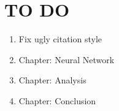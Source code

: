 \chapter{TO DO}
\begin{enumerate}
    \item Fix ugly citation style
    \item Chapter: Neural Network 
    \item Chapter: Analysis
    \item Chapter: Conclusion
\end{enumerate}